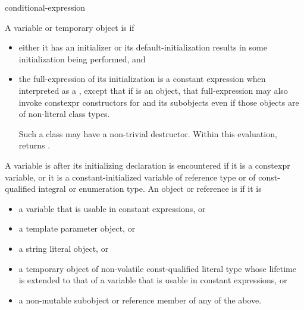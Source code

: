 \begin{bnf}
\br
    conditional-expression
\end{bnf}

\pnum
A variable or temporary object  is  if
\begin{itemize}
\item
  either it has an initializer or
  its default-initialization results in some initialization being performed, and
\item
  the full-expression of its initialization is a constant expression
  when interpreted as a ,
  except that if  is an object,
  that full-expression
  may also invoke constexpr constructors
  for  and its subobjects
  even if those objects are of non-literal class types.
  \begin{note}
  Such a class may have a non-trivial destructor.
  Within this evaluation,
  returns .
\end{note}
\end{itemize}

\pnum
A variable is  after
its initializing declaration is encountered if it is a constexpr variable, or
it is a constant-initialized variable
of reference type or of const-qualified integral or enumeration type.
An object or reference is  if it is
\begin{itemize}
\item a variable that is usable in constant expressions, or
\item a template parameter object, or
\item a string literal object, or
\item a temporary object of non-volatile const-qualified literal type
  whose lifetime is extended
  to that of a variable that is usable in constant expressions, or
\item a non-mutable subobject or reference member of any of the above.
\end{itemize}

